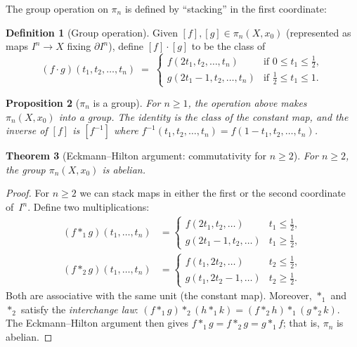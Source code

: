\documentclass[12pt,a4paper,openany]{book}
\theoremstyle{definition}
\newtheorem{definition}{Definition}[chapter]
\theoremstyle{plain}
\newtheorem{theorem}[definition]{Theorem}
\newtheorem{proposition}[definition]{Proposition}
\theoremstyle{remark}
\begin{document}
The group operation on $\pi_n$ is defined by ``stacking'' in the first
coordinate:

\begin{definition}[Group operation]
Given $[f],[g]\in\pi_n(X,x_0)$ (represented as maps $I^n\to X$ fixing
$\partial I^n$), define $[f]\cdot[g]$ to be the class of
\[
  (f\cdot g)(t_1,t_2,\dots,t_n)
  \;=\;
  \begin{cases}
    f(2t_1,t_2,\dots,t_n) & \text{if } 0\le t_1\le\tfrac12,\\
    g(2t_1-1,t_2,\dots,t_n) & \text{if } \tfrac12\le t_1\le 1.
  \end{cases}
\]
\end{definition}

\begin{proposition}[$\pi_n$ is a group]
\label{prop:pin-group}
For $n\ge1$, the operation above makes $\pi_n(X,x_0)$ into a group.
The identity is the class of the constant map, and the inverse of
$[f]$ is $[f^{-1}]$ where
$f^{-1}(t_1,t_2,\dots,t_n)=f(1-t_1,t_2,\dots,t_n)$.
\end{proposition}

\begin{theorem}[Eckmann--Hilton argument: commutativity for $n\ge2$]
\label{thm:eckmann-hilton}
For $n\ge2$, the group $\pi_n(X,x_0)$ is abelian.
\end{theorem}

\begin{proof}
For $n\ge2$ we can stack maps in either the first or the second
coordinate of~$I^n$.  Define two multiplications:
\begin{align*}
  (f*_1 g)(t_1,\dots,t_n)
  &=
  \begin{cases} f(2t_1,t_2,\dots) & t_1\le\tfrac12,\\
    g(2t_1-1,t_2,\dots) & t_1\ge\tfrac12,\end{cases} \\
  (f*_2 g)(t_1,\dots,t_n)
  &=
  \begin{cases} f(t_1,2t_2,\dots) & t_2\le\tfrac12,\\
    g(t_1,2t_2-1,\dots) & t_2\ge\tfrac12.\end{cases}
\end{align*}
Both are associative with the same unit (the constant map).  Moreover,
$*_1$ and $*_2$ satisfy the \emph{interchange law}:
$(f*_1 g)*_2(h*_1 k) = (f*_2 h)*_1(g*_2 k)$.  The Eckmann--Hilton
argument then gives $f*_1 g = f*_2 g = g*_1 f$; that is, $\pi_n$ is
abelian.
\end{proof}
\end{document}
